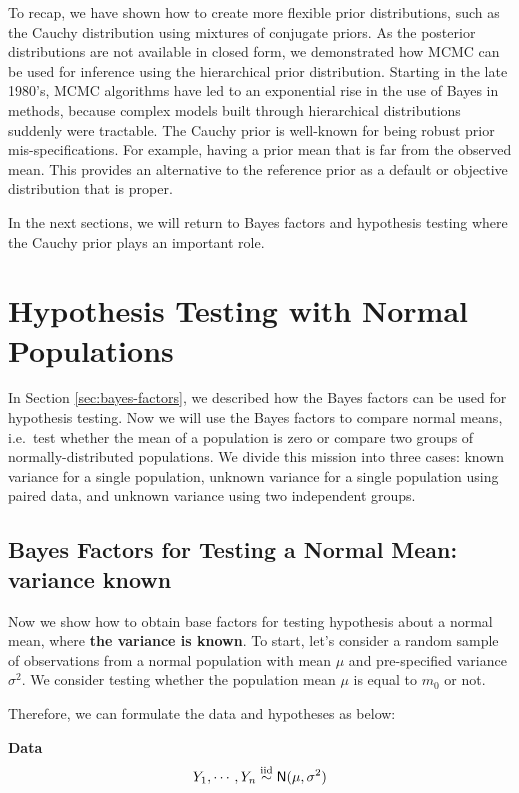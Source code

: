\documentclass[]{book}
\theoremstyle{definition}
\theoremstyle{definition}
\theoremstyle{definition}
\theoremstyle{remark}
\begin{document}
To recap, we have shown how to create more flexible prior distributions,
such as the Cauchy distribution using mixtures of conjugate priors. As
the posterior distributions are not available in closed form, we
demonstrated how MCMC can be used for inference using the hierarchical
prior distribution. Starting in the late 1980's, MCMC algorithms have
led to an exponential rise in the use of Bayes in methods, because
complex models built through hierarchical distributions suddenly were
tractable. The Cauchy prior is well-known for being robust prior
mis-specifications. For example, having a prior mean that is far from
the observed mean. This provides an alternative to the reference prior
as a default or objective distribution that is proper.

In the next sections, we will return to Bayes factors and hypothesis
testing where the Cauchy prior plays an important role.

\chapter{Hypothesis Testing with Normal
Populations}\label{hypothesis-testing-with-normal-populations}

In Section \ref{sec:bayes-factors}, we described how the Bayes factors
can be used for hypothesis testing. Now we will use the Bayes factors to
compare normal means, i.e.~test whether the mean of a population is zero
or compare two groups of normally-distributed populations. We divide
this mission into three cases: known variance for a single population,
unknown variance for a single population using paired data, and unknown
variance using two independent groups.

\section{Bayes Factors for Testing a Normal Mean: variance
known}\label{sec:known-var}

Now we show how to obtain base factors for testing hypothesis about a
normal mean, where \textbf{the variance is known}. To start, let's
consider a random sample of observations from a normal population with
mean \(\mu\) and pre-specified variance \(\sigma^2\). We consider
testing whether the population mean \(\mu\) is equal to \(m_0\) or not.

Therefore, we can formulate the data and hypotheses as below:

\textbf{Data} \[Y_1, \cdots, Y_n \mathrel{\mathop{\sim}\limits^{\rm iid}} \textsf{N}(\mu, \sigma^2)\]
\end{document}

